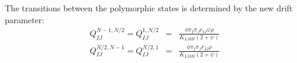 \documentclass{llncs}
\newcommand{\polyProb}{\ensuremath{\phi}}}
\newcommand{\Klmh}{\ensuremath{K_{LMH}}}}
\begin{document}
The transitions between the polymorphic states is determined by the new drift parameter:
\begin{eqnarray}
   Q_{IJ}^{N-1,N/2} = Q_{IJ}^{1,N/2} & = & \frac{\polyProb\pi_I\pi_J r_{IJ}\psi \rho}{\Klmh (2 + \psi)} \\
   Q_{IJ}^{N/2,N-1} = Q_{IJ}^{N/2,1} & = & \frac{\polyProb\pi_I\pi_J r_{IJ} \rho}{\Klmh (2 + \psi)} 
\end{eqnarray}






\end{document}
